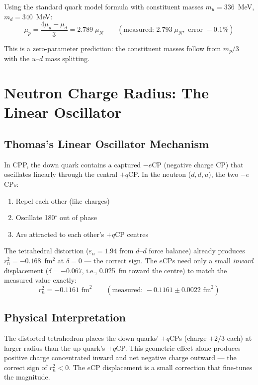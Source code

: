 \documentclass[12pt,a4paper]{article}
\begin{document}
Using the standard quark model formula with constituent masses $m_u = 336$~MeV, $m_d = 340$~MeV:
\begin{equation}
\mu_p = \frac{4\mu_u - \mu_d}{3} = 2.789\;\mu_N \qquad (\text{measured: } 2.793\;\mu_N, \text{ error } -0.1\%)
\end{equation}

This is a zero-parameter prediction: the constituent masses follow from $m_p/3$ with the $u$--$d$ mass splitting.

\section{Neutron Charge Radius: The Linear Oscillator}
\label{sec:neutron}

\subsection{Thomas's Linear Oscillator Mechanism}

In CPP, the down quark contains a captured $-e$CP (negative charge CP) that oscillates linearly through the central $+q$CP. In the neutron ($d, d, u$), the two $-e$CPs:
\begin{enumerate}
\item Repel each other (like charges)
\item Oscillate 180$^\circ$ out of phase
\item Are attracted to each other's $+q$CP centres
\end{enumerate}

The tetrahedral distortion ($\varepsilon_n = 1.94$ from $d$--$d$ force balance) already produces $r_n^2 = -0.168$~fm$^2$ at $\delta = 0$ --- the correct sign. The $e$CPs need only a small \emph{inward} displacement ($\delta = -0.067$, i.e., 0.025~fm toward the centre) to match the measured value exactly:
\begin{equation}
r_n^2 = -0.1161 \text{ fm}^2 \qquad (\text{measured: } -0.1161 \pm 0.0022 \text{ fm}^2)
\end{equation}

\subsection{Physical Interpretation}

The distorted tetrahedron places the down quarks' $+q$CPs (charge $+2/3$ each) at larger radius than the up quark's $+q$CP. This geometric effect alone produces positive charge concentrated inward and net negative charge outward --- the correct sign of $r_n^2 < 0$. The $e$CP displacement is a small correction that fine-tunes the magnitude.
\end{document}
